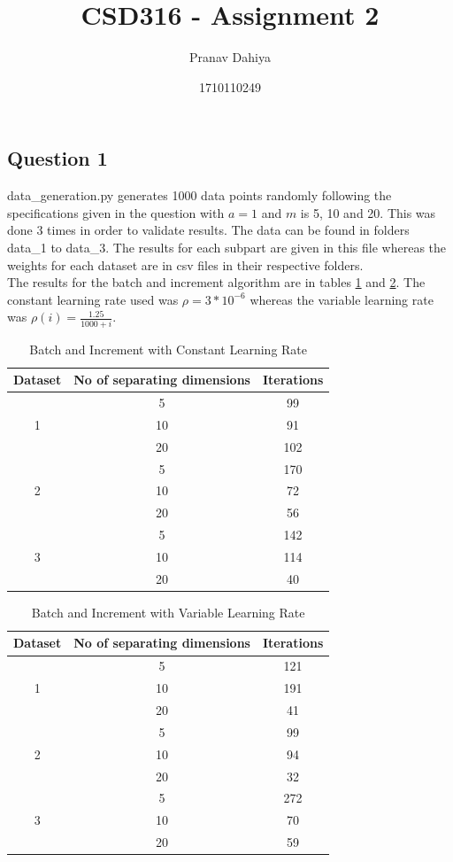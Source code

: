 \documentclass[12pt]{article}
\title{CSD316 - Assignment 2}
\author{Pranav Dahiya}
\date{1710110249}
\begin{document}
\maketitle

\subsection*{Question 1}

data\_generation.py generates 1000 data points randomly following the specifications given in the question with $a = 1$ and $m$ is 5, 10 and 20. This was done 3 times in order to validate results. The data can be found in folders data\_1 to data\_3. The results for each subpart are given in this file whereas the weights for each dataset are in csv files in their respective folders.\\

The results for the batch and increment algorithm are in tables \ref{tab:batch_and_increment_const} and \ref{tab:batch_and_increment_variable}. The constant learning rate used was $\rho = 3 * 10^{-6}$ whereas the variable learning rate was $\rho(i)=\frac{1.25}{1000+i}$.

\begin{table}[H]
  \centering
  \caption{Batch and Increment with Constant Learning Rate}
  \label{tab:batch_and_increment_const}
  \begin{tabular}{c|c|c}
    Dataset & No of separating dimensions & Iterations \\
    \hline
    \multirow{3}{*}{1} & 5 & 99\\
    & 10 & 91\\
    & 20 & 102\\
    \hline
    \multirow{3}{*}{2} & 5 & 170\\
    & 10 & 72\\
    & 20 & 56\\
    \hline
    \multirow{3}{*}{3} & 5 & 142\\
    & 10 & 114\\
    & 20 & 40\\
  \end{tabular}
\end{table}

\begin{table}[H]
  \centering
  \caption{Batch and Increment with Variable Learning Rate}
  \label{tab:batch_and_increment_variable}
  \begin{tabular}{c|c|c}
    Dataset & No of separating dimensions & Iterations \\
    \hline
    \multirow{3}{*}{1} & 5 & 121\\
    & 10 & 191\\
    & 20 & 41\\
    \hline
    \multirow{3}{*}{2} & 5 & 99\\
    & 10 & 94\\
    & 20 & 32\\
    \hline
    \multirow{3}{*}{3} & 5 & 272\\
    & 10 & 70\\
    & 20 & 59\\
  \end{tabular}
\end{table}
\end{document}
